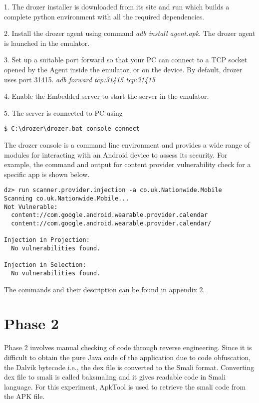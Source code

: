 \documentclass{mproj}
\begin{document}
1. The drozer installer is downloaded from its site and run which builds a complete python environment with all the required dependencies. 

2. Install the drozer agent using command \textit{adb install agent.apk}. The drozer agent is launched in the emulator.

3. Set up a suitable port forward so that your PC can connect to a TCP socket opened by the Agent inside the emulator, or on the device. By default, drozer uses port 31415. \textit{ adb forward tcp:31415 tcp:31415}

4. Enable the Embedded server to start the server in the emulator.

5. The server is connected to PC using 
 \begin{Verbatim}[fontsize=\small]
$ C:\drozer\drozer.bat console connect
\end{Verbatim}

The drozer console is a command line environment and provides a wide range of modules for interacting with an Android device to assess its security. For example, the command and output for content provider vulnerability check for a specific app is shown below. 
 \begin{Verbatim}[fontsize=\small]
dz> run scanner.provider.injection -a co.uk.Nationwide.Mobile
Scanning co.uk.Nationwide.Mobile...
Not Vulnerable:
  content://com.google.android.wearable.provider.calendar
  content://com.google.android.wearable.provider.calendar/

Injection in Projection:
  No vulnerabilities found.

Injection in Selection:
  No vulnerabilities found.
\end{Verbatim}

The commands and their description can be found in appendix 2.

\section{Phase 2}

Phase 2 involves manual checking of code through reverse engineering. Since it is difficult to obtain the pure Java code of the application due to code obfuscation, the Dalvik bytecode i.e., the dex file is converted to the Smali format. Converting dex file to smali is called baksmaling and it gives readable code in Smali language. For this experiment, ApkTool is used to retrieve the smali code from the APK file. 
\end{document}
